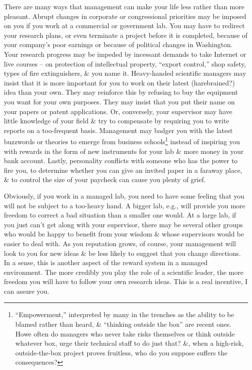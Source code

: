 \documentclass{article}
\begin{document}
\begin{enumerate}
\begin{itemize}
\begin{itemize}
			There are many ways that management can make your life less rather than more pleasant. Abrupt changes in corporate or congressional priorities may be imposed on you if you work at a commercial or government lab. You may have to redirect your research plans, or even terminate a project before it is completed, because of your company's poor earnings or because of political changes in Washington. Your research progress may be impeded by incessant demands to take Internet or live courses -- on protection of intellectual property, ``export control,'' shop safety, types of fire extinguishers, \& you name it. Heavy-handed scientific managers may insist that it is more important for you to work on their latest (harebrained?) idea than your own. They may reinforce this by refusing to buy the equipment you want for your own purposes. They may insist that you put their name on your papers or patent applications. Or, conversely, your supervisor may have little knowledge of your field \& try to compensate by requiring you to write reports on a too-frequent basis. Management may badger you with the latest buzzwords or theories to emerge from business schools\footnote{``Empowerment,'' interpreted by many in the trenches as the ability to be blamed rather than heard, \& ``thinking outside the box'' are recent ones. Howe often do managers who never take risks themselves or think outside whatever box, urge their technical staff to do just that? \&, when a high-risk, outside-the-box project proves fruitless, who do you suppose suffers the consequences?} instead of inspiring you with rewards in the form of new instruments for your lab \& more money in your bank account. Lastly, personality conflicts with someone who has the power to fire you, to determine whether you can give an invited paper in a faraway place, \& to control the size of your paycheck can cause you plenty of grief.

			Obviously, if you work in a managed lab, you need to have some feeling that you will not be subject to a too-heavy hand. A bigger lab, e.g., will provide you more freedom to correct a bad situation than a smaller one would. At a large lab, if you just can't get along with your supervisor, there may be several other groups who would be happy to benefit from your wisdom \& whose supervisors would be easier to deal with. As you reputation grows, of course, your management will look to you for new ideas \& be less likely to suggest that you change directions. In a sense, this is another aspect of the reward system in a managed environment. The more credibly you play the role of a scientific leader, the more freedom you will have to follow your own research ideas. This is a real incentive, I can assure you.


\end{itemize}
\end{itemize}
\end{enumerate}
\end{document}
